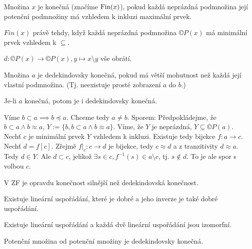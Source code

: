 \documentclass[12pt]{article}                   %
\begin{document}

    \begin{definice}
        Množina $x$ je konečná (značíme $\operatorname{Fin}(x)$), pokud každá neprázdná podmnožina její potenční podmnožiny má vzhledem k inkluzi maximální prvek.
    \end{definice}

    \begin{pozorovani}
        $Fin(x)$ právě tehdy, když každá neprázdná podmnožina $©P(x)$ má minimální prvek vzhledem k $\subseteq$.

        \begin{dukazin}
            $d: ©P(x) \rightarrow ©P(x), y \mapsto x\setminus y$ vše obrátí.
        \end{dukazin}
    \end{pozorovani}

    \begin{definice}
        Množina $a$ je dedekindovsky konečná, pokud má větší mohutnost než každá její vlastní podmnožina. (Tj. neexistuje prosté zobrazení $a$ do $b$.)
    \end{definice}

    \begin{lemma}
        Je-li $a$ konečná, potom je i dedekindovsky konečná.

        \begin{dukazin}
            Víme $b \subset a \implies b \preceq a$. Chceme tedy $a ≠ b$. Sporem: Předpokládejme, že $b \subset a \land b \approx a$, $Y := \{b, b\subset a \land b \approx a\}$. Víme, že $Y$ je neprázdná, $Y \subseteq ©P(a)$. Nechť $c$ je minimální prvek $Y$ vzhledem k inkluzi. Existuje tedy bijekce $f: a \rightarrow c$. Nechť $d = f[c]$. Zřejmě $f|_c: c \rightarrow d$ je bijekce, tedy $c \approx d$ a z tranzitivity $d \approx a$. Tedy $d \in Y$. Ale $d \subset c$, jelikož $\exists s \in c, f^{-1}(s) \in a \setminus c$, tj. $s \notin d$. To je ale spor s volbou $c$.
        \end{dukazin}
    \end{lemma}

    \begin{poznamka}
        V ZF je opravdu konečnost silnější než dedekindovská konečnost.
    \end{poznamka}

    \begin{poznamka}
        Existuje lineární uspořádání, které je dobré a jeho inverze je také dobré uspořádání.

        Existuje lineární uspořádání a každá dvě lineární uspořádání jsou izomorfní.

        Potenční množina od potenční množiny je dedekindovsky konečná.
    \end{poznamka}
\end{document}
